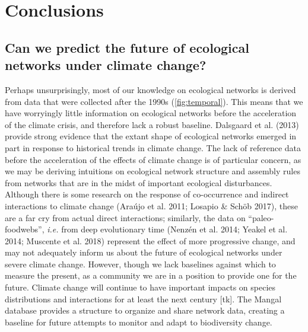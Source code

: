 \hypertarget{conclusions}{%
\section{Conclusions}\label{conclusions}}

\hypertarget{can-we-predict-the-future-of-ecological-networks-under-climate-change}{%
\subsection{Can we predict the future of ecological networks under
climate
change?}\label{can-we-predict-the-future-of-ecological-networks-under-climate-change}}

Perhaps unsurprisingly, most of our knowledge on ecological networks is
derived from data that were collected after the 1990s
(\cref{fig:temporal}). This means that we have worryingly little
information on ecological networks before the acceleration of the
climate crisis, and therefore lack a robust baseline. Dalsgaard et al.
(2013) provide strong evidence that the extant shape of ecological
networks emerged in part in response to historical trends in climate
change. The lack of reference data before the acceleration of the
effects of climate change is of particular concern, as we may be
deriving intuitions on ecological network structure and assembly rules
from networks that are in the midst of important ecological
disturbances. Although there is some research on the response of
co-occurrence and indirect interactions to climate change (Araújo et al.
2011; Losapio \& Schöb 2017), these are a far cry from actual direct
interactions; similarly, the data on ``paleo-foodwebs'', \emph{i.e.}
from deep evolutionary time (Nenzén et al. 2014; Yeakel et al. 2014;
Muscente et al. 2018) represent the effect of more progressive change,
and may not adequately inform us about the future of ecological networks
under severe climate change. However, though we lack baselines against
which to measure the present, as a community we are in a position to
provide one for the future. Climate change will continue to have
important impacts on species distributions and interactions for at least
the next century {[}tk{]}. The Mangal database provides a structure to
organize and share network data, creating a baseline for future attempts
to monitor and adapt to biodiversity change.

